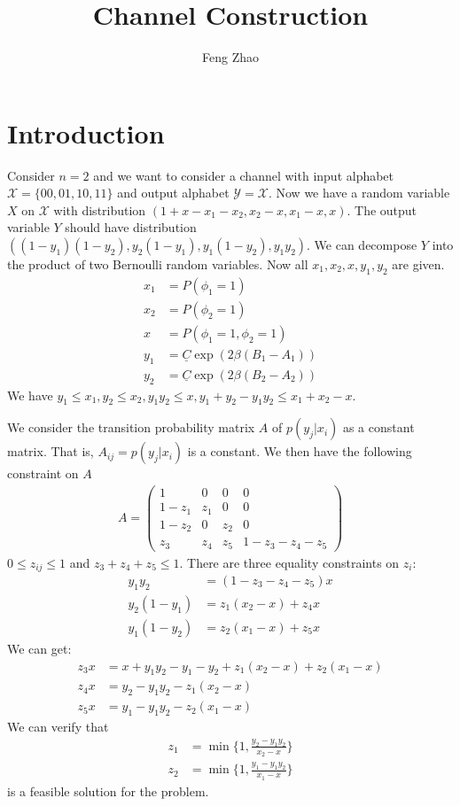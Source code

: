\documentclass{article}
\title{Channel Construction}
\author{Feng Zhao}
\date
\begin{document}
\maketitle

\section{Introduction}
Consider $n=2$ and we want to consider a channel
with input alphabet $\mathcal{X}=\{00,01,10,11\}$
and output alphabet $\mathcal{Y}=\mathcal{X}$.
Now we have a random variable $X$ on $\mathcal{X}$
with distribution $(1+x-x_1-x_2, x_2-x,x_1-x,x)$.
The output variable $Y$ should have distribution
$((1-y_1)(1-y_2), y_2(1-y_1), y_1(1-y_2), y_1y_2)$.
We can decompose $Y$ into the product of two Bernoulli
random variables.
Now all $x_1, x_2, x, y_1, y_2$ are given.
\begin{align*}
x_ 1 & = P(\phi_1 = 1) \\
x_2 & = P(\phi_2 = 1) \\
x & = P(\phi_1 = 1, \phi_2 =1) \\
y_1 & = \underline{C} \exp(2\beta (B_1 - A_1)) \\
y_2 & = \underline{C} \exp(2\beta (B_2 - A_2))
\end{align*}
We have $y_1 \leq x_1, y_2 \leq x_2, y_1y_2 \leq x, y_1 + y_2 - y_1y_2 \leq x_1 + x_2 - x$.

We consider the transition probability matrix $A$ of $p(y_j | x_i)$ as a constant matrix. That is,
$A_{ij} = p(y_j | x_i)$ is a constant.
We then have the following constraint on $A$
\begin{align*}
    A = \begin{pmatrix}
    1 & 0 & 0 & 0 \\
    1-z_1 & z_1 & 0 & 0\\
    1-z_2 & 0 & z_2 & 0 \\
    z_3 & z_4 & z_5 & 1-z_3-z_4 - z_5
    \end{pmatrix}
\end{align*}
$0\leq z_{ij} \leq 1$ and $z_3 + z_4 + z_5 \leq 1$.
There are three equality constraints on $z_i$:
\begin{align*}
    y_1y_2 & = (1-z_3 - z_4 - z_5) x\\
    y_2(1-y_1) &= z_1(x_2-x) + z_4 x \\
    y_1(1-y_2) &= z_2(x_1 - x) + z_5x
\end{align*}
We can get:
\begin{align}
    z_3 x & = x + y_1y_2 - y_1 - y_2 + z_1(x_2 - x) + z_2(x_1 - x)\label{eq3}\\
    z_4 x &= y_2 - y_1y_2 - z_1(x_2 - x) \label{eq1}\\
    z_5 x &= y_1 - y_1y_2 - z_2(x_1 - x) \label{eq2}
\end{align}
We can verify that
\begin{align*}
    z_1 &= \min\{1, \frac{y_2 - y_1y_2}{x_2 -x}\}\\
    z_2 &= \min\{1, \frac{y_1 - y_1y_2}{x_1 -x}\}
\end{align*}
is a feasible solution for the problem.
\end{document}
